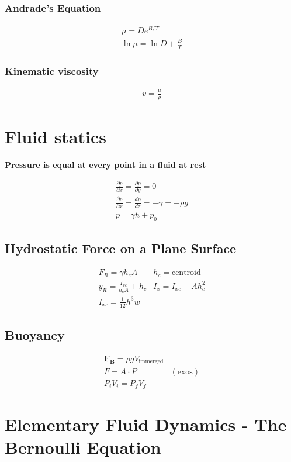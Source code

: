 \documentclass[a4paper]{amsart}
\begin{document}
\subsubsection{Andrade's Equation}
\begin{eqnarray*}
	\mu=De^{B/T}\\
	\ln{\mu}=\ln{D}+\frac{B}{T}
\end{eqnarray*}

\subsubsection{Kinematic viscosity}
\begin{eqnarray*}
	v=\frac{\mu}{\rho}
\end{eqnarray*}

\section{Fluid statics}
\textbf{Pressure is equal at every point in a fluid at rest}

\begin{eqnarray*}
	\frac{\partial p}{\partial x}=\frac{\partial p}{\partial y}=0\\
	\frac{\partial p}{\partial x}=\frac{dp}{dz}=-\gamma=-\rho g\\
	p=\gamma h+p_0
\end{eqnarray*}
\subsection{Hydrostatic Force on a Plane Surface}
\begin{eqnarray*}
	F_R=\gamma h_cA&h_c=\text{centroid}\\
	y_R=\frac{I_{xc}}{h_cA}+h_c & I_x=I_{xc}+Ah_c^2\\
	I_{xc}=\frac{1}{12}h^3w
\end{eqnarray*}

\subsection{Buoyancy}
\begin{eqnarray*}
	\mathbf{F_B}=\rho gV_{\text{immerged}}\\
	F=A\cdot P & (\text{exos})\\
	P_iV_i=P_fV_f
\end{eqnarray*}

\section{Elementary Fluid Dynamics - The Bernoulli Equation}
\end{document}
